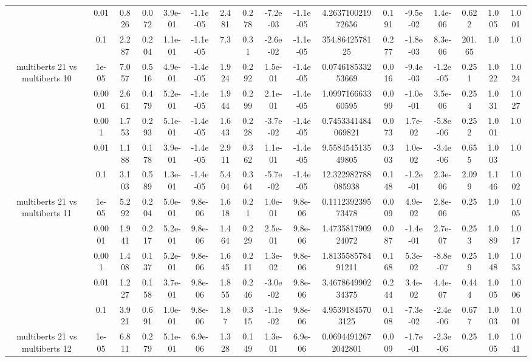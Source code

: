 \begin{tabular}{|c|c|c|c|c|c|c|c|c|c|c|c|c|c|c|c|c|}
 & 0.01 & 0.826 & 0.072 & 3.9e-01 & -1.1e-05 & 2.481 & 0.278 & -7.2e-03 & -1.1e-05 & 4.263710021972656 & 0.191 & -9.5e-02 & 1.4e-06 & 0.622 & 1.005 & 1.001 \\
 & 0.1 & 2.287 & 0.204 & 1.1e-01 & -1.1e-05 & 7.3 & 0.31 & -2.6e-02 & -1.1e-05 & 354.8642578125 & 0.277 & -1.8e-03 & 8.3e-06 & 201.65 & 1.0 & 1.0 \\
\hline
\multirow{5}{*}{multiberts 21 vs multiberts 10} & 1e-05 & 7.057 & 0.516 & 4.9e-01 & -1.4e-05 & 1.924 & 0.292 & 1.5e-01 & -1.4e-05 & 0.074618533253669 & 0.016 & -9.4e-03 & -1.2e-05 & 0.251 & 1.022 & 1.024 \\
 & 0.0001 & 2.661 & 0.479 & 5.2e-01 & -1.4e-05 & 1.944 & 0.299 & 2.1e-01 & -1.4e-05 & 1.099716663360595 & 0.099 & -1.0e-01 & 3.5e-06 & 0.254 & 1.031 & 1.027 \\
 & 0.001 & 1.753 & 0.293 & 5.1e-01 & -1.4e-05 & 1.643 & 0.228 & -3.7e-02 & -1.4e-05 & 0.7453341484069821 & 0.073 & 1.7e-02 & -5.8e-06 & 0.252 & 1.001 & 1.0 \\
 & 0.01 & 1.188 & 0.178 & 3.9e-01 & -1.4e-05 & 2.911 & 0.362 & 1.1e-01 & -1.4e-05 & 9.558454513549805 & 0.303 & 1.0e-02 & -3.4e-06 & 0.655 & 1.003 & 1.0 \\
 & 0.1 & 3.103 & 0.589 & 1.3e-01 & -1.4e-05 & 5.404 & 0.364 & -5.7e-02 & -1.4e-05 & 12.322982788085938 & 0.148 & -1.2e-01 & 2.3e-06 & 2.099 & 1.146 & 1.002 \\
\hline
\multirow{5}{*}{multiberts 21 vs multiberts 11} & 1e-05 & 5.292 & 0.204 & 5.0e-01 & 9.8e-06 & 1.618 & 0.21 & 1.0e-01 & 9.8e-06 & 0.111239239573478 & 0.009 & 4.9e-02 & 2.8e-06 & 0.25 & 1.0 & 1.005 \\
 & 0.0001 & 1.941 & 0.217 & 5.2e-01 & 9.8e-06 & 1.464 & 0.229 & 2.5e-01 & 9.8e-06 & 1.473581790924072 & 0.087 & -1.4e-01 & 2.7e-07 & 0.253 & 1.089 & 1.017 \\
 & 0.001 & 1.408 & 0.137 & 5.2e-01 & 9.8e-06 & 1.645 & 0.211 & 1.3e-02 & 9.8e-06 & 1.813558578491211 & 0.168 & 5.3e-02 & -8.8e-07 & 0.259 & 1.048 & 1.053 \\
 & 0.01 & 1.227 & 0.158 & 3.7e-01 & 9.8e-06 & 1.855 & 0.246 & -3.0e-02 & 9.8e-06 & 3.467864990234375 & 0.244 & 3.4e-02 & 4.4e-07 & 0.444 & 1.005 & 1.006 \\
 & 0.1 & 3.921 & 0.691 & 1.0e-01 & 9.8e-06 & 1.87 & 0.315 & -1.1e-02 & 9.8e-06 & 4.95391845703125 & 0.108 & -7.3e-02 & -2.4e-06 & 0.677 & 1.003 & 1.001 \\
\hline
\multirow{5}{*}{multiberts 21 vs multiberts 12} & 1e-05 & 6.811 & 0.279 & 5.1e-01 & 6.9e-06 & 1.328 & 0.149 & 1.3e-01 & 6.9e-06 & 0.06944912672042801 & 0.009 & -1.7e-01 & -2.3e-06 & 0.25 & 1.005 & 1.041 \\

\end{tabular}
